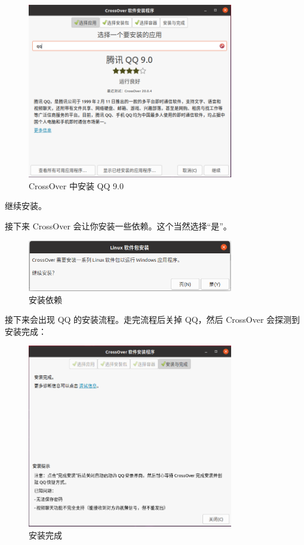 \documentclass[UTF-8]{ctexart}
\begin{document}
				\begin{figure}[H]
					\centering
					\includegraphics[width=0.8\textwidth]{fig/crossover_find_qq.png}
					\caption*{CrossOver 中安装 QQ 9.0}
				\end{figure}
				
				继续安装。
				
				接下来 CrossOver 会让你安装一些依赖。这个当然选择“是”。
				
				\begin{figure}[H]
					\centering
					\includegraphics[width=0.8\textwidth]{fig/crossover_install_linux.png}
					\caption*{安装依赖}
				\end{figure}
			
				接下来会出现 QQ 的安装流程。走完流程后关掉 QQ，然后 CrossOver 会探测到安装完成：
				
				\begin{figure}[H]
					\centering
					\includegraphics[width=0.8\textwidth]{fig/crossover_install_qq_success.png}
					\caption*{安装完成}
				\end{figure}
				
\end{document}
